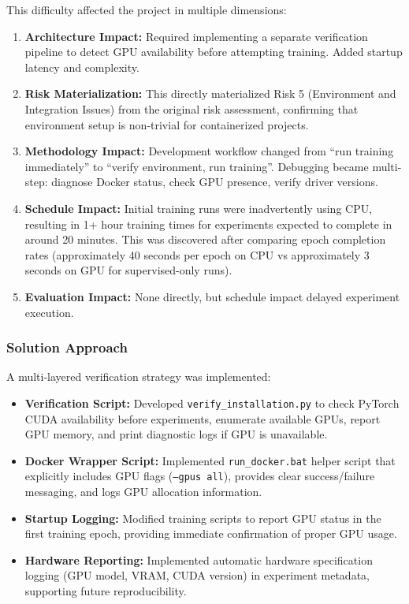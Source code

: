 This difficulty affected the project in multiple dimensions:

\begin{enumerate}
    \item \textbf{Architecture Impact:} Required implementing a separate verification pipeline to detect GPU availability before attempting training. Added startup latency and complexity.
    
    \item \textbf{Risk Materialization:} This directly materialized Risk 5 (Environment and Integration Issues) from the original risk assessment, confirming that environment setup is non-trivial for containerized projects.
    
    \item \textbf{Methodology Impact:} Development workflow changed from ``run training immediately'' to ``verify environment, run training''. Debugging became multi-step: diagnose Docker status, check GPU presence, verify driver versions.
    
    \item \textbf{Schedule Impact:} Initial training runs were inadvertently using CPU, resulting in 1+ hour training times for experiments expected to complete in around 20 minutes. This was discovered after comparing epoch completion rates (approximately 40 seconds per epoch on CPU vs approximately 3 seconds on GPU for supervised-only runs).
    
    \item \textbf{Evaluation Impact:} None directly, but schedule impact delayed experiment execution.
\end{enumerate}

\subsubsection{Solution Approach}

A multi-layered verification strategy was implemented:

\begin{itemize}
    \item \textbf{Verification Script:} Developed \texttt{verify\_installation.py} to check PyTorch CUDA availability before experiments, enumerate available GPUs, report GPU memory, and print diagnostic logs if GPU is unavailable.
    
    \item \textbf{Docker Wrapper Script:} Implemented \texttt{run\_docker.bat} helper script that explicitly includes GPU flags (\texttt{--gpus all}), provides clear success/failure messaging, and logs GPU allocation information.
    
    \item \textbf{Startup Logging:} Modified training scripts to report GPU status in the first training epoch, providing immediate confirmation of proper GPU usage.
    
    \item \textbf{Hardware Reporting:} Implemented automatic hardware specification logging (GPU model, VRAM, CUDA version) in experiment metadata, supporting future reproducibility.
\end{itemize}

